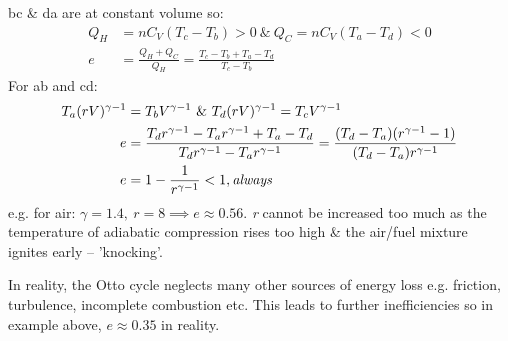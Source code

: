 \documentclass[a4paper, 11pt, normalem]{report}
\begin{document}
bc \& da are at constant volume so:
\begin{align}
    Q_{H} &= nC_{V}(T_{c} - T_{b}) > 0 ~\&~ Q_{C} = nC_{V}(T_{a} - T_{d}) < 0 \\
    e &= \frac{Q_{H} + Q_{C}}{Q_{H}} = \frac{T_{c} - T_{b} + T_{a} - T_{d}}{T_{c} - T_{b}}
\end{align}
For ab and cd:
\begin{align}
    T_{a}(rV)^{\gamma - 1} &= T_{b}V^{\gamma - 1} ~\&~ T_{d}(rV)^{\gamma - 1} = T_{c}V^{\gamma - 1} \\
    e &= \frac{T_{d}r^{\gamma - 1} - T_{a}r^{\gamma - 1} + T_{a} - T_{d}}{T_{d}r^{\gamma - 1} - T_{a}r^{\gamma - 1}} = \frac{(T_{d} - T_{a})(r^{\gamma - 1} - 1)}{(T_{d} - T_{a})r^{\gamma - 1}} \\
    e &= 1 - \frac{1}{r^{\gamma - 1}} < 1, \emph{\text{always}}
\end{align}
e.g. for air: $\gamma = 1.4, ~ r = 8 \implies e \approx 0.56$.
\emph{r} cannot be increased too much as the temperature of adiabatic compression rises too high \& the air/fuel mixture ignites early -- 'knocking'.

In reality, the Otto cycle neglects many other sources of energy loss e.g. friction, turbulence, incomplete combustion etc.
This leads to further inefficiencies so in example above, $e \approx 0.35$ in reality.
\end{document}
